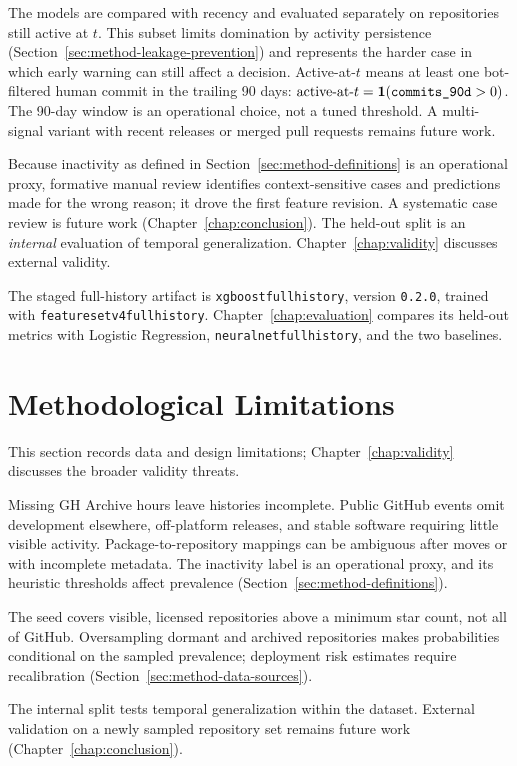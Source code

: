 The models are compared with recency and evaluated separately on repositories
still active at \(t\). This subset limits domination by activity persistence
(Section~\ref{sec:method-leakage-prevention}) and represents the harder case in
which early warning can still affect a decision. Active-at-\(t\) means at least one
bot-filtered human commit in the trailing 90 days:
\(\text{active-at-}t = \mathbf{1}\!\left(\text{\texttt{commits\_90d}} > 0\right)\).
The 90-day window is an operational choice, not a tuned threshold. A multi-signal
variant with recent releases or merged pull requests remains future work.

Because inactivity as defined in Section~\ref{sec:method-definitions} is an
operational proxy, formative manual review identifies
context-sensitive cases and predictions made for the wrong reason; it drove the
first feature revision. A systematic case review is future work
(Chapter~\ref{chap:conclusion}). The held-out split is an \emph{internal}
evaluation of temporal generalization. Chapter~\ref{chap:validity} discusses
external validity.

The staged full-history artifact is
\texttt{xgboost\sdash full\sdash history}, version \texttt{0.2.0}, trained with
\texttt{feature\sdash set\sdash v4\sdash full\sdash history}.
Chapter~\ref{chap:evaluation} compares its held-out metrics with Logistic
Regression, \texttt{neural\sdash net\sdash full\sdash history}, and the two
baselines.

\section{Methodological Limitations}
\label{sec:method-limitations}

This section records data and design limitations; Chapter~\ref{chap:validity}
discusses the broader validity threats.

Missing GH Archive hours leave histories incomplete. Public GitHub events omit
development elsewhere, off-platform releases, and stable software requiring
little visible activity. Package-to-repository mappings can be ambiguous after
moves or with incomplete metadata. The inactivity label is an operational proxy,
and its heuristic thresholds affect prevalence
(Section~\ref{sec:method-definitions}).

The seed covers visible, licensed repositories above a minimum star count, not
all of GitHub. Oversampling dormant and archived repositories makes
probabilities conditional on the sampled prevalence; deployment risk estimates
require recalibration (Section~\ref{sec:method-data-sources}).

The internal split tests temporal generalization within the dataset. External
validation on a newly sampled repository set remains future work
(Chapter~\ref{chap:conclusion}).
